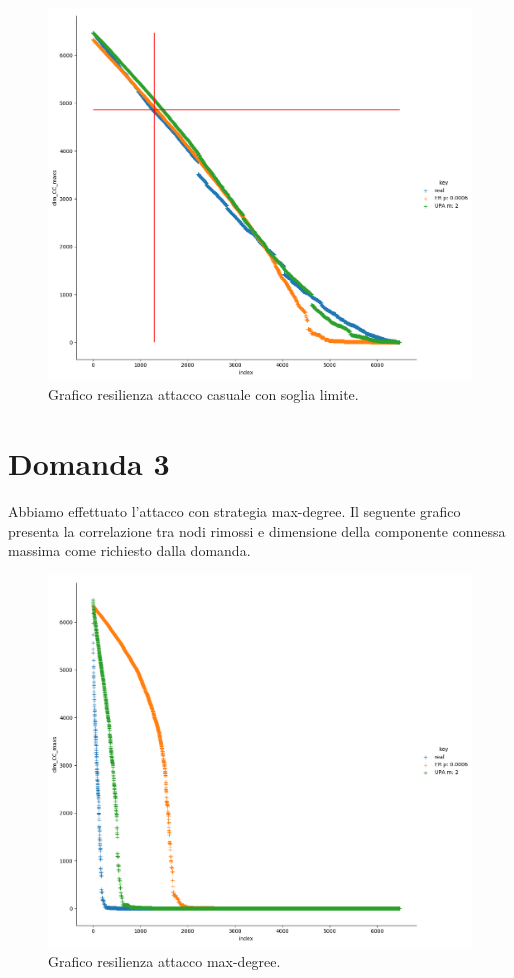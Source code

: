 \documentclass{article}
\begin{document}
\begin{figure}[H]
	\centering
	\includegraphics[width=1.00\textwidth]{figures/figure_random_line}
	\caption{Grafico resilienza attacco casuale con soglia limite.}
\end{figure}

\newpage
	\section*{Domanda 3}
	Abbiamo effettuato l'attacco con strategia max-degree. Il seguente grafico presenta la correlazione tra nodi rimossi e dimensione della componente connessa massima come richiesto dalla domanda.
	\begin{figure}[H]
		\centering
		\includegraphics[width=1.0\textwidth]{figures/figure_maxdegree}
		\caption{Grafico resilienza attacco max-degree.}
	\end{figure}
\newpage
\end{document}

